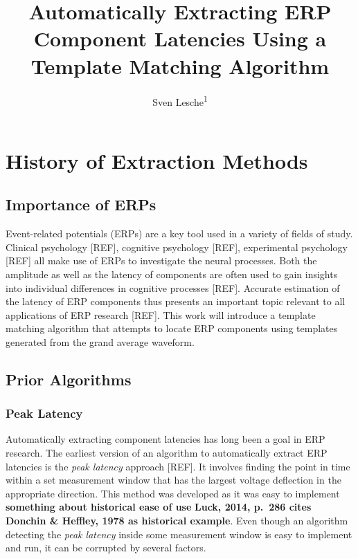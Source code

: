 \documentclass[
  man,floatsintext]{apa7}
\title{Automatically Extracting ERP Component Latencies Using a Template Matching Algorithm}
\author{Sven Lesche\textsuperscript{1}}
\date{}
\affiliation{\vspace{0.5cm}\textsuperscript{1} Ruprecht-Karls-University Heidelberg}
\begin{document}
\maketitle

\hypertarget{history-of-extraction-methods}{%
\section{History of Extraction Methods}\label{history-of-extraction-methods}}

\hypertarget{importance-of-erps}{%
\subsection{Importance of ERPs}\label{importance-of-erps}}

Event-related potentials (ERPs) are a key tool used in a variety of fields of study. Clinical psychology {[}REF{]}, cognitive psychology {[}REF{]}, experimental psychology {[}REF{]} all make use of ERPs to investigate the neural processes. Both the amplitude as well as the latency of components are often used to gain insights into individual differences in cognitive processes {[}REF{]}. Accurate estimation of the latency of ERP components thus presents an important topic relevant to all applications of ERP research {[}REF{]}. This work will introduce a template matching algorithm that attempts to locate ERP components using templates generated from the grand average waveform.

\hypertarget{prior-algorithms}{%
\subsection{Prior Algorithms}\label{prior-algorithms}}

\hypertarget{peak-latency}{%
\subsubsection{Peak Latency}\label{peak-latency}}

Automatically extracting component latencies has long been a goal in ERP research. The earliest version of an algorithm to automatically extract ERP latencies is the \emph{peak latency} approach {[}REF{]}. It involves finding the point in time within a set measurement window that has the largest voltage deflection in the appropriate direction. This method was developed as it was easy to implement \textbf{something about historical ease of use} \textbf{Luck, 2014, p.~286 cites Donchin \& Heffley, 1978 as historical example}. Even though an algorithm detecting the \emph{peak latency} inside some measurement window is easy to implement and run, it can be corrupted by several factors.
\end{document}
